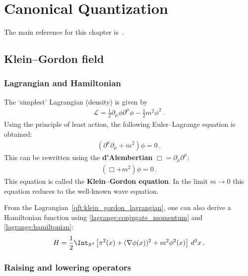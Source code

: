 \chapter{Canonical Quantization}

    The main reference for this chapter is~\citet{peskin_introduction_1995}.

\section{Klein--Gordon field}
\subsection{Lagrangian and Hamiltonian}

    The `simplest' Lagrangian (density) is given by
    \begin{gather}
        \label{qft:klein_gordon_lagrangian}
        \mathcal{L} = \frac{1}{2}\partial_\mu\phi\partial^\mu\phi - \frac{1}{2}m^2\phi^2\,.
    \end{gather}
    Using the principle of least action, the following Euler--Lagrange equation is obtained:
    \begin{gather}
        \left(\partial^\mu\partial_\mu + m^2\right)\phi = 0\,.
    \end{gather}
    This can be rewritten using the \textbf{d'Alembertian} $\Box = \partial_\mu\partial^\mu$:
    \begin{gather}
        \label{qft:klein_gordon_equation}
        (\Box+m^2)\phi = 0\,.
    \end{gather}
    This equation is called the \textbf{Klein--Gordon equation}. In the limit $m\rightarrow0$ this equation reduces to the well-known wave equation.

    From the Lagrangian~\eqref{qft:klein_gordon_lagrangian}, one can also derive a Hamiltonian function using \cref{lagrange:conjugate_momentum} and \cref{lagrange:hamiltonian}:
    \begin{gather}
        \label{qft:klein_gordon_hamiltonian}
        H = \frac{1}{2}\Int_{\mathbb{R}^3}\left[\pi^2(x) + (\nabla\phi(x))^2 + m^2\phi^2(x)\right]\,d^3x\,.
    \end{gather}

\subsection{Raising and lowering operators}

